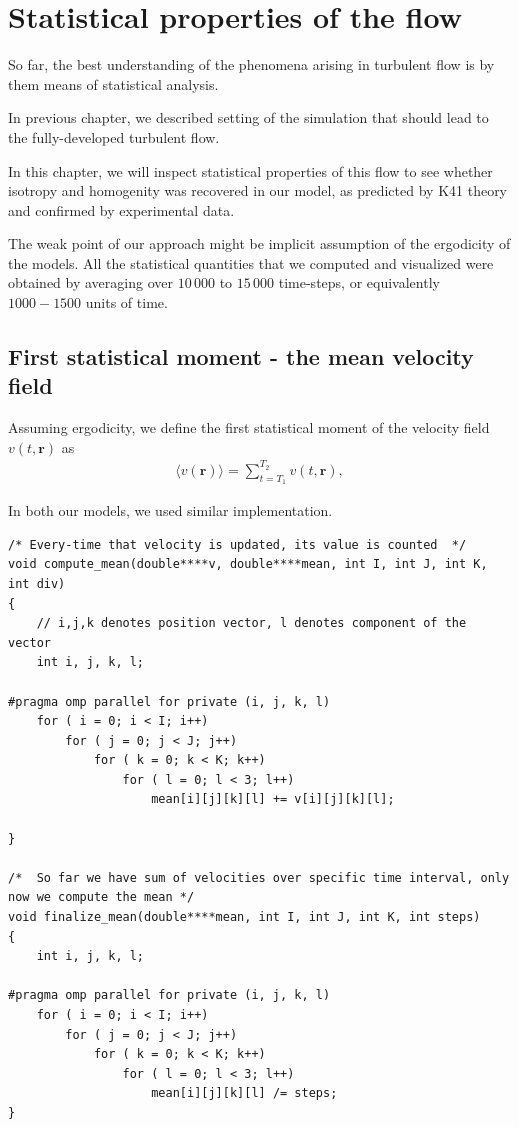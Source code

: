 \section{Statistical properties of the flow}

So far, the best understanding of the phenomena arising in turbulent flow is by them means of statistical analysis.

In previous chapter, we described setting of the simulation that should lead to the fully-developed turbulent flow.

In this chapter, we will inspect statistical properties of this flow to see whether isotropy and homogenity was recovered in our model, as predicted by K41 theory and confirmed by experimental data.

The weak point of our approach might be implicit assumption of the ergodicity of the models.
All the statistical quantities that we computed and visualized were obtained by averaging over $10\,000$ to $15\,000$ time-steps, or equivalently $1000 - 1500$ units of time.

\subsection{First statistical moment - the mean velocity field}
Assuming ergodicity, we define the first statistical moment of the velocity field $v(t,\bm{r})$ as
\begin{align}
\langle v(\bm{r}) \rangle = \sum_{t = T_1}^{T_2} v(t,\bm{r}),
\end{align}

In both our models, we used similar implementation.
\begin{lstlisting}
/* Every-time that velocity is updated, its value is counted  */
void compute_mean(double****v, double****mean, int I, int J, int K, int div)
{
	// i,j,k denotes position vector, l denotes component of the vector
	int i, j, k, l;

#pragma omp parallel for private (i, j, k, l)
	for ( i = 0; i < I; i++)
		for ( j = 0; j < J; j++)
			for ( k = 0; k < K; k++)
				for ( l = 0; l < 3; l++)
					mean[i][j][k][l] += v[i][j][k][l];
	
}

/*  So far we have sum of velocities over specific time interval, only now we compute the mean */
void finalize_mean(double****mean, int I, int J, int K, int steps)
{
	int i, j, k, l;

#pragma omp parallel for private (i, j, k, l)
	for ( i = 0; i < I; i++)
		for ( j = 0; j < J; j++)
			for ( k = 0; k < K; k++)
				for ( l = 0; l < 3; l++)
					mean[i][j][k][l] /= steps;
}

\end{lstlisting}

